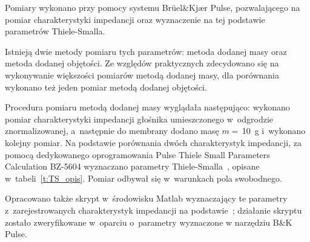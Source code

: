 \documentclass[12pt]{oska}
\begin{document}
	Pomiary wykonano przy pomocy systemu Brüel\&Kjær Pulse, pozwalającego na pomiar charakterystyki impedancji oraz wyznaczenie na tej podstawie parametrów Thiele-Smalla.
	
	Istnieją dwie metody pomiaru tych parametrów: metoda dodanej masy oraz metoda dodanej objętości. Ze względów praktycznych zdecydowano się na wykonywanie większości pomiarów metodą dodanej masy, dla porównania wykonano też jeden pomiar metodą dodanej objętości.
	
	Procedura pomiaru metodą dodanej masy wyglądała następująco: wykonano pomiar charakterystyki impedancji głośnika umieszczonego w~odgrodzie znormalizowanej, a~następnie do membrany dodano masę $m=\,$\SI{10}{\gram} i~wykonano kolejny pomiar. Na podstawie porównania dwóch charakterystyk impedancji, za pomocą dedykowanego oprogramowania Pulse Thiele Small Parameters Calculation BZ-5604 wyznaczano parametry Thiele-Smalla~\cite{BK_pulse_TS}, opisane w~tabeli~\ref{t:TS_opis}. Pomiar odbywał się w~warunkach pola swobodnego.
	
	Opracowano także skrypt w~środowisku Matlab wyznaczający te parametry z~zarejestrowanych charakterystyk impedancji na podstawie~\cite{dobrucki}; działanie skryptu zostało zweryfikowane w~oparciu o~parametry wyznaczone w narzędziu B\&K Pulse.
	
\end{document}
